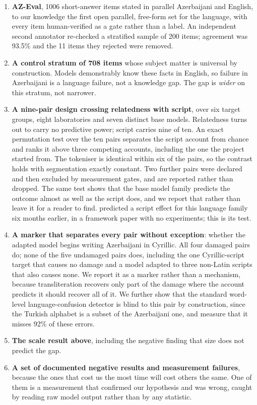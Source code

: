 \documentclass[final]{clv2025}
\begin{document}
\begin{enumerate}
\item \textbf{AZ-Eval}, 1006 short-answer items stated in parallel Azerbaijani
and English, to our knowledge the first open parallel, free-form set for the
language, with every item human-verified as a gate rather than a label. An
independent second annotator re-checked a stratified sample of 200 items;
agreement was 93.5\% and the 11 items they rejected were removed.

\item \textbf{A control stratum of 708 items} whose subject matter is universal
by construction. Models demonstrably know these facts in English, so failure in
Azerbaijani is a language failure, not a knowledge gap. The gap is \emph{wider}
on this stratum, not narrower.

\item \textbf{A nine-pair design crossing relatedness with script}, over six
target groups, eight laboratories and seven distinct base models. Relatedness
turns out to carry no predictive power; script carries nine of ten. An exact
permutation test over the ten pairs separates the script account from chance
and ranks it above three competing accounts, including the one the project
started from. The tokeniser is identical within six of the pairs, so the
contrast holds with segmentation exactly constant. Two further pairs were
declared and then excluded by measurement gates, and are reported rather than
dropped. The same test shows that the base model family predicts the outcome
almost as well as the script does, and we report that rather than leave it for
a reader to find.
 predicted a script effect for this language
family six months earlier, in a framework paper with no experiments; this is
its test.

\item \textbf{A marker that separates every pair without exception}: whether
the adapted model begins writing Azerbaijani in Cyrillic. All four damaged
pairs do; none of the five undamaged pairs does, including the one
Cyrillic-script target that causes no damage and a model adapted to three
non-Latin scripts that also causes none. We report it as a marker rather than a
mechanism, because transliteration recovers only part of the damage where the
account predicts it should recover all of it. We further show that the standard
word-level language-confusion detector is blind to this pair by construction,
since the Turkish alphabet is a subset of the Azerbaijani one, and measure that
it misses 92\% of these errors.

\item \textbf{The scale result above}, including the negative finding that size
does not predict the gap.

\item \textbf{A set of documented negative results and measurement failures},
because the ones that cost us the most time will cost others the same. One of
them is a measurement that confirmed our hypothesis and was wrong, caught by
reading raw model output rather than by any statistic.
\end{enumerate}
\end{document}

